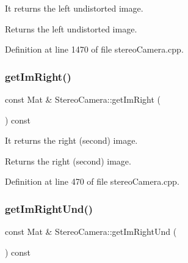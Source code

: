 It returns the left undistorted image. 

\begin{DoxyReturn}{Returns}
the left undistorted image. 
\end{DoxyReturn}


Definition at line 1470 of file stereo\+Camera.\+cpp.


\begin{DoxyCode}{0}

\end{DoxyCode}
\mbox{\label{classStereoCamera_ac7930aa4fa0681246e74c08cf4b1079b}} 
\subsubsection{\texorpdfstring{getImRight()}{getImRight()}}
{\footnotesize\ttfamily const Mat \& Stereo\+Camera\+::get\+Im\+Right (\begin{DoxyParamCaption}{ }\end{DoxyParamCaption}) const}



It returns the right (second) image. 

\begin{DoxyReturn}{Returns}
the right (second) image. 
\end{DoxyReturn}


Definition at line 470 of file stereo\+Camera.\+cpp.


\begin{DoxyCode}{0}

\end{DoxyCode}
\mbox{\label{classStereoCamera_a19009c20003a5c7e957a4b3c34913fe9}} 
\subsubsection{\texorpdfstring{getImRightUnd()}{getImRightUnd()}}
{\footnotesize\ttfamily const Mat \& Stereo\+Camera\+::get\+Im\+Right\+Und (\begin{DoxyParamCaption}{ }\end{DoxyParamCaption}) const}



